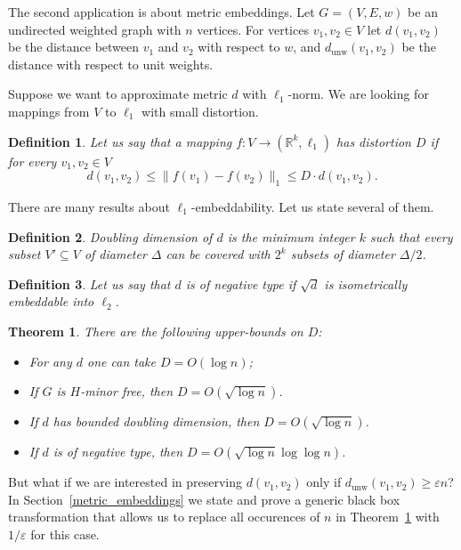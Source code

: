 \documentclass[12pt]{article}
\newcommand{\dunw}{d_{\mathrm{unw}}}
\newcommand{\eps}{\varepsilon}
\newtheorem{definition}{Definition}
\newtheorem{theorem}{Theorem}
\begin{document}
    The second application is about metric embeddings.
    Let $G = (V, E, w)$ be an undirected weighted graph with $n$ vertices.
    For vertices $v_1, v_2 \in V$ let $d(v_1, v_2)$ be the distance between $v_1$ and $v_2$ with respect to $w$,
    and $\dunw(v_1, v_2)$ be the distance with respect to unit weights.

    Suppose we want to approximate metric $d$ with $\ell_1$-norm. We are looking for mappings from $V$ to $\ell_1$ with small distortion. 
    \begin{definition}
        Let us say that a mapping $f \colon V \to (\mathbb{R}^k, \ell_1)$ has distortion $D$ if for every $v_1, v_2 \in V$
        $$
            d(v_1, v_2) \leq \|f(v_1) - f(v_2)\|_1 \leq D \cdot d(v_1, v_2).
        $$
    \end{definition}

    There are many results about $\ell_1$-embeddability. Let us state several of them.

    \begin{definition}
        Doubling dimension of $d$ is the minimum integer $k$ such that every subset $V' \subseteq V$ of diameter $\Delta$
        can be covered with $2^k$ subsets of diameter $\Delta / 2$.
    \end{definition}

    \begin{definition}
        Let us say that $d$ is of negative type if $\sqrt{d}$ is isometrically embeddable into $\ell_2$.
    \end{definition}

    \begin{theorem}
        \label{l1_embeddings}
        There are the following upper-bounds on $D$:
        \begin{itemize}
            \item \cite{B85} For any $d$ one can take $D = O(\log n)$;
            \item \cite{R99} If $G$ is $H$-minor free, then $D = O(\sqrt{\log n})$. 
            \item \cite{GKL03} If $d$ has bounded doubling dimension, then $D = O(\sqrt{\log n})$.
            \item \cite{ALN05} If $d$ is of negative type, then $D = O(\sqrt{\log n} \log \log n)$. 
        \end{itemize}
    \end{theorem}

    But what if we are interested in preserving $d(v_1, v_2)$ only if $\dunw(v_1, v_2) \geq \eps n$?
    In Section~\ref{metric_embeddings} we state and prove a generic black box transformation
    that allows us to replace all occurences of $n$ in Theorem~\ref{l1_embeddings} with $1 / \eps$ for this case.
\end{document}
